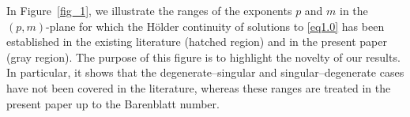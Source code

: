 \documentclass[a4paper,11pt,fullpage]{article}
\numberwithin{equation}{section}
\begin{document}
\vskip0.1cm \noindent In Figure~\ref{fig_1}, we illustrate the ranges of the exponents $p$ and $m$ in the $(p,m)$-plane for which the H\"older continuity of solutions to \eqref{eq1.0} has been established in the existing literature (hatched region) and in the present paper (gray region). The purpose of this figure is to highlight the novelty of our results. In particular, it shows that the degenerate--singular and singular--degenerate cases have not been covered in the literature, whereas these ranges are treated in the present paper up to the Barenblatt number.
%
%
%
\end{document}

